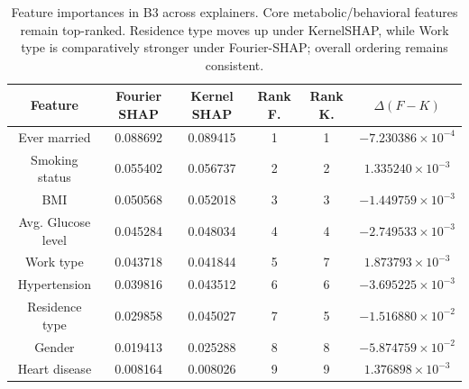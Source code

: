 \documentclass[letterpaper,11pt]{article}
\numberwithin{equation}{section}
\numberwithin{equation}{section}
\begin{document}
\begin{table}[H]
    \centering
    \begin{tabular}{|c||c|c|c|c|c|} \hline 
         Feature & Fourier SHAP & Kernel SHAP & Rank F. & Rank K. & $\Delta (F-K) $ \\ \hline \hline 
         Ever married & 0.088692 & 0.089415 & 1 & 1 &	$-7.230386\times 10^{-4}$ \\ \hline 
        Smoking status & 0.055402 & 0.056737 & 2 & 2 & $1.335240\times 10^{-3}$ \\ \hline 
        BMI & 0.050568 & 0.052018 & 3 & 3	& $-1.449759\times 10^{-3}$ \\ \hline 
        Avg. Glucose level & 0.045284 & 0.048034 & 4 & 4 & $-2.749533\times 10^{-3}$ \\ \hline 
        Work type & 0.043718 & 0.041844 & 5 & 7 &	$1.873793\times 10^{-3}$ \\ \hline 
        Hypertension & 0.039816 & 0.043512 & 6 & 6 & $-3.695225\times 10^{-3}$ \\ \hline 
        Residence type & 0.029858 &	0.045027 & 7 &	5 &	$-1.516880\times 10^{-2}$ \\ \hline 
        Gender & 0.019413 &	0.025288 &	8 &	8 &	$-5.874759\times 10^{-2}$\\ \hline 
        Heart disease &	0.008164 & 0.008026 & 9 & 9 & $1.376898\times 10^{-3}$\\ \hline 
    \end{tabular}
    \caption{Feature importances in B3 across explainers. Core metabolic/behavioral features remain top-ranked. Residence type moves up under KernelSHAP, while Work type is comparatively stronger under Fourier-SHAP; overall ordering remains consistent.}
\end{table}
\end{document}
